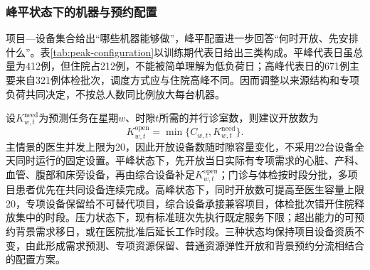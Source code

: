 \subsubsection{峰平状态下的机器与预约配置}

项目—设备集合给出“哪些机器能够做”，峰平配置进一步回答“何时开放、先安排什么”。表\ref{tab:peak-configuration}以训练期代表日给出三类构成。平峰代表日虽总量为412例，但住院占212例，不能被简单理解为低负荷日；高峰代表日的671例主要来自321例体检批次，调度方式应与住院高峰不同。因而调整以来源结构和专项负荷共同决定，不按总人数同比例放大每台机器。

\begin{table}[H]
\centering
\caption{训练期峰平状态及对应资源配置原则}
\label{tab:peak-configuration}

\end{table}

设$K_{w,t}^{\mathrm{need}}$为预测任务在星期$w$、时隙$t$所需的并行诊室数，则建议开放数为
\begin{equation}
K_{w,t}^{\mathrm{open}}=\min\{C_{w,t},K_{w,t}^{\mathrm{need}}\}.
\end{equation}
主情景的医生并发上限为20，因此开放设备数随时隙容量变化，不采用22台设备全天同时运行的固定设置。平峰状态下，先开放当日实际有专项需求的心脏、产科、血管、腹部和床旁设备，再由综合设备补足$K_{w,t}^{\mathrm{open}}$；门诊与体检按时段分批，多项目患者优先在共同设备连续完成。高峰状态下，同时开放数可提高至医生容量上限20，专项设备保留给不可替代项目，综合设备承接兼容项目，体检批次错开住院释放集中的时段。压力状态下，现有标准班次先执行既定服务下限；超出能力的可预约背景需求移日，或在医院批准后延长工作时段。三种状态均保持项目设备资质不变，由此形成需求预测、专项资源保留、普通资源弹性开放和背景预约分流相结合的配置方案。

